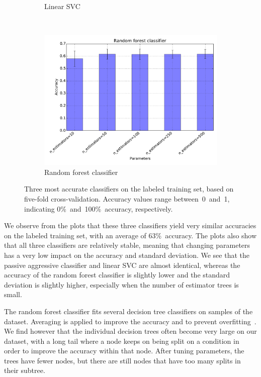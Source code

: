 \documentclass{article}
\begin{document}
\begin{figure}[h!]
\begin{subfigure}{.48\textwidth}
    \caption{Linear SVC}\label{fig:classifiers-linear-svc}
  \end{subfigure} \\
  \vspace{0.5cm}
  \begin{subfigure}{.48\textwidth}
    \centering
    \includegraphics[width=\textwidth]{Images/Random_forest.pdf}
    \caption{Random forest classifier}\label{fig:classifiers-random-forest}
  \end{subfigure}
  \caption{Three most accurate classifiers on the labeled training set, based
           on five-fold cross-validation. Accuracy values range 
           between~0~and~1, indicating 0\%~and~100\%~accuracy, 
           respectively.}\label{fig:classifiers}
\end{figure}

We observe from the plots that these three classifiers yield very similar
accuracies on the labeled training set, with an average of 63\%~accuracy.
The plots also show that all three classifiers are relatively stable,
meaning that changing parameters has a very low impact on the accuracy
and standard deviation. We see that the passive aggressive classifier and
linear SVC are almost identical, whereas the accuracy of the random forest
classifier is slightly lower and the standard deviation is slightly higher,
especially when the number of estimator trees is small.

The random forest classifier fits several decision tree classifiers on
samples of the dataset. Averaging is applied to improve the accuracy and
to prevent overfitting~\cite{breiman2001randomforests}. We find however that 
the individual decision trees often become very large on our dataset, with 
a long tail where a node keeps on being split on a condition in order to 
improve the accuracy within that node. After tuning parameters, the trees have 
fewer nodes, but there are still nodes that have too many splits in their 
subtree.
\end{document}
